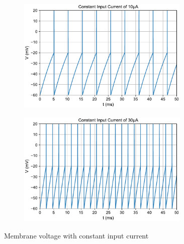 \documentclass{scrartcl}
\begin{document}
\begin{figure}[p]
	\centering
	\begin{subfigure}{\textwidth}
	\includegraphics[width=0.9\textwidth]{figures/V_const_10.pdf}
	\vspace{0.8cm}
	\end{subfigure}
	\begin{subfigure}{\textwidth}
	\includegraphics[width=0.9\textwidth]{figures/V_const_30.pdf}
	\end{subfigure}
	\vspace{0.8cm}
	\caption{Membrane voltage with constant input current}
	\label{fig:V_const}
\end{figure}
\end{document}
